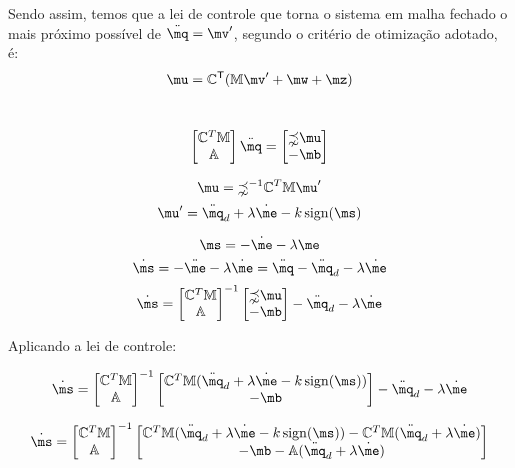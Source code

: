 Sendo assim, temos que a lei de controle que torna o sistema em malha fechado o mais pr\'oximo poss\'ivel de $\ddot{\mq} = \mv'$, segundo o crit\'erio de otimiza\c{c}\~ao adotado, \'e:
\begin{equation} \label{eq:ControlLawFinal}
\mu = \mC^\msT ( \mM \mv' + \mw + \mz )
\end{equation}

\newpage

\\

$$
\begin{bmatrix}
\mC^T \mM \\
\mA
\end{bmatrix}
\ddot{\mq}
=
\begin{bmatrix}
\mathbb{\zeta} \mu \\
-\mb
\end{bmatrix}
$$



$$ \mu = \mathbb{\zeta}^{-1} \mC^T \mM \mu' $$
$$ \mu' = \ddot{\mq}_d + \lambda \dot{\me} - k  \sign (\ms) $$

$$ \ms = - \dot{\me} - \lambda \me $$
$$ \dot{\ms} = - \ddot{\me} - \lambda \dot{\me} = \ddot{\mq} - \ddot{\mq}_d  - \lambda \dot{\me} $$
$$ \dot{\ms} =  \begin{bmatrix}
\mC^T \mM \\
\mA
\end{bmatrix}^{-1}
\begin{bmatrix}
\mathbb{\zeta} \mu \\
-\mb
\end{bmatrix}
 - \ddot{\mq}_d  - \lambda \dot{\me} $$
 
Aplicando a lei de controle:

$$ \dot{\ms} =  \begin{bmatrix}
\mC^T \mM \\
\mA
\end{bmatrix}^{-1}
\begin{bmatrix}
 \mC^T \mM (\ddot{\mq}_d + \lambda \dot{\me} - k  \sign (\ms)) \\
-\mb
\end{bmatrix}
 - \ddot{\mq}_d  - \lambda \dot{\me} $$
 
 $$ \dot{\ms} =  \begin{bmatrix}
\mC^T \mM \\
\mA
\end{bmatrix}^{-1}
\begin{bmatrix}
 \mC^T \mM (\ddot{\mq}_d + \lambda \dot{\me} - k  \sign (\ms)) -  \mC^T \mM(\ddot{\mq}_d  + \lambda \dot{\me}) \\
-\mb - \mA(\ddot{\mq}_d  + \lambda \dot{\me})
\end{bmatrix} $$

